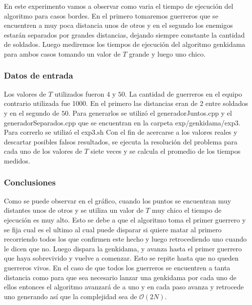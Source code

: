 			En este experimento vamos a observar como varia el tiempo de ejecución del algoritmo para casos bordes. En el primero tomaremos guerreros que se encuentren a muy poca distancia  unos de otros y en el segundo los enemigos estarán separados por grandes distancias, dejando siempre constante la cantidad de soldados. Luego mediremos los tiempos de ejecución del algoritmo genkidama para ambos casos tomando un valor de $T$ grande y luego uno chico.\;
		
		\subsubsection*{Datos de entrada}\;

			Los valores de $T$ utilizados fueron $4$ y $50$.
			La cantidad de guerreros en el equipo contrario utilizada fue 1000.
			En el primero las distancias eran de 2 entre soldados y en el segundo de $50$.
			Para generarlos se utilizó el generadorJuntos.cpp y el generadorSeparados.cpp  que se encuentran en la carpeta exp/genkidama/exp3.
			Para correrlo se utilizó el exp3.sh 
			Con el fin de acercarse a los valores reales y descartar posibles falsos resultados, se ejecuta la resolución del problema para cada uno de los valores de $T$ siete veces y se calcula el promedio de los tiempos medidos.\;

    	\subsubsection*{Conclusiones}\;

			Como se puede observar en el gráfico, cuando los puntos se encuentran muy distantes unos de otros y se utiliza un valor de $T$ muy chico el tiempo de ejecución es muy alto. 
			Esto se debe a que el algoritmo toma el primer guerrero y se fija cual es el ultimo al cual puede disparar si quiere matar al primero recorriendo todos los que confirmen este hecho y luego retrocediendo uno cuando le dicen que no. Luego dispara la genkidama, y avanza hasta el primer guerrero que haya sobrevivido y vuelve a comenzar. Esto se repite hasta que no queden guerreros vivos. En el caso de que todos los guerreros se encuentren a tanta distancia como para que sea necesario lanzar una genkidama por cada uno de ellos entonces el algoritmo avanzará de a uno y en cada paso avanza y retrocede uno generando así que la complejidad sea de $\mathcal{O}(2N)$. 
